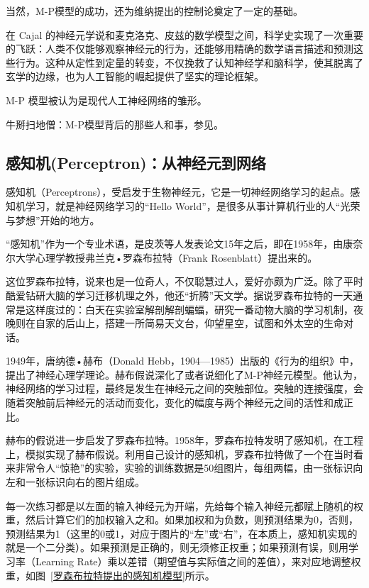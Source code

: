 当然，M-P模型的成功，还为维纳提出的控制论奠定了一定的基础。

在 Cajal 的神经元学说和麦克洛克、皮兹的数学模型之间，科学史实现了一次重要的飞跃：人类不仅能够观察神经元的行为，还能够用精确的数学语言描述和预测这些行为。这种从定性到定量的转变，不仅挽救了认知神经学和脑科学，使其脱离了玄学的边缘，也为人工智能的崛起提供了坚实的理论框架。
 
M-P 模型被认为是现代人工神经网络的雏形。


牛掰扫地僧：M-P模型背后的那些人和事，参见\cite{张玉宏2018}。

\subsection{感知机(Perceptron)：从神经元到网络}

感知机（Perceptrons），受启发于生物神经元，它是一切神经网络学习的起点。感知机学习，就是神经网络学习的“Hello World”，是很多从事计算机行业的人“光荣与梦想”开始的地方。


“感知机”作为一个专业术语，是皮茨等人发表论文15年之后，即在1958年，由康奈尔大学心理学教授弗兰克•罗森布拉特（Frank Rosenblatt）提出来的。

这位罗森布拉特，说来也是一位奇人，不仅聪慧过人，爱好亦颇为广泛。除了平时酷爱钻研大脑的学习迁移机理之外，他还“折腾”天文学。据说罗森布拉特的一天通常是这样度过的：白天在实验室解剖解剖蝙蝠，研究一番动物大脑的学习机制，夜晚则在自家的后山上，搭建一所简易天文台，仰望星空，试图和外太空的生命对话。

1949年，唐纳德•赫布（Donald Hebb，1904—1985）出版的《行为的组织》中，提出了神经心理学理论。赫布假说深化了或者说细化了M-P神经元模型。他认为，神经网络的学习过程，最终是发生在神经元之间的突触部位。突触的连接强度，会随着突触前后神经元的活动而变化，变化的幅度与两个神经元之间的活性和成正比。

赫布的假说进一步启发了罗森布拉特。1958年，罗森布拉特发明了感知机，在工程上，模拟实现了赫布假说。利用自己设计的感知机，罗森布拉特做了一个在当时看来非常令人“惊艳”的实验，实验的训练数据是50组图片，每组两幅，由一张标识向左和一张标识向右的图片组成。

每一次练习都是以左面的输入神经元为开端，先给每个输入神经元都赋上随机的权重，然后计算它们的加权输入之和。如果加权和为负数，则预测结果为0，否则，预测结果为1（这里的0或1，对应于图片的“左”或“右”，在本质上，感知机实现的就是一个二分类）。如果预测是正确的，则无须修正权重；如果预测有误，则用学习率（Learning Rate）乘以差错（期望值与实际值之间的差值），来对应地调整权重，如图~\ref{罗森布拉特提出的感知机模型}所示。


